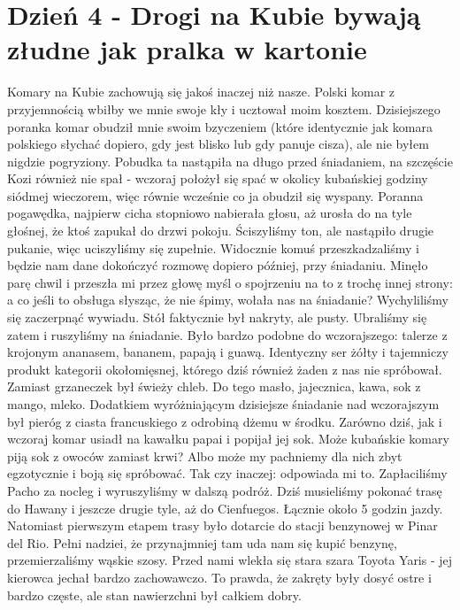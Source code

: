
\chapter[Drogi na Kubie bywają złudne jak pralka w kartonie]{Dzień 4 - Drogi na Kubie bywają złudne jak pralka w kartonie}

Komary na Kubie zachowują się jakoś inaczej niż nasze.
Polski komar z przyjemnością wbiłby we mnie swoje kły i ucztował moim kosztem.
Dzisiejszego poranka komar obudził mnie swoim bzyczeniem (które identycznie jak komara polskiego słychać dopiero, gdy jest blisko lub gdy panuje cisza), ale nie byłem nigdzie pogryziony.
Pobudka ta nastąpiła na długo przed śniadaniem, na szczęście Kozi również nie spał - wczoraj położył się spać w okolicy kubańskiej godziny siódmej wieczorem, więc równie wcześnie co ja obudził się wyspany.
Poranna pogawędka, najpierw cicha stopniowo nabierała głosu, aż urosła do na tyle głośnej, że ktoś zapukał do drzwi pokoju.
Ściszyliśmy ton, ale nastąpiło drugie pukanie, więc uciszyliśmy się zupełnie.
Widocznie komuś przeszkadzaliśmy i będzie nam dane dokończyć rozmowę dopiero później, przy śniadaniu.
Minęło parę chwil i przeszła mi przez głowę myśl o spojrzeniu na to z trochę innej strony: a co jeśli to obsługa słysząc, że nie śpimy, wołała nas na śniadanie?
Wychyliliśmy się zaczerpnąć wywiadu.
Stół faktycznie był nakryty, ale pusty.
Ubraliśmy się zatem i ruszyliśmy na śniadanie.
Było bardzo podobne do wczorajszego: talerze z krojonym ananasem, bananem, papają i guawą.
Identyczny ser żółty i tajemniczy produkt kategorii okołomięsnej, którego dziś również żaden z nas nie spróbował.
Zamiast grzaneczek był świeży chleb.
Do tego masło, jajecznica, kawa, sok z mango, mleko.
Dodatkiem wyróżniającym dzisiejsze śniadanie nad wczorajszym był pieróg z ciasta francuskiego z odrobiną dżemu w środku.
Zarówno dziś, jak i wczoraj komar usiadł na kawałku papai i popijał jej sok.
Może kubańskie komary piją sok z owoców zamiast krwi?
Albo może my pachniemy dla nich zbyt egzotycznie i boją się spróbować.
Tak czy inaczej: odpowiada mi to.
Zapłaciliśmy Pacho za nocleg i wyruszyliśmy w dalszą podróż.
Dziś musieliśmy pokonać trasę do Hawany i jeszcze drugie tyle, aż do Cienfuegos.
Łącznie około 5 godzin jazdy.
Natomiast pierwszym etapem trasy było dotarcie do stacji benzynowej w Pinar del Rio.
Pełni nadziei, że przynajmniej tam uda nam się kupić benzynę, przemierzaliśmy wąskie szosy.
Przed nami wlekła się stara szara Toyota Yaris - jej kierowca jechał bardzo zachowawczo. 
To prawda, że zakręty były dosyć ostre i bardzo częste, ale stan nawierzchni był całkiem dobry.
